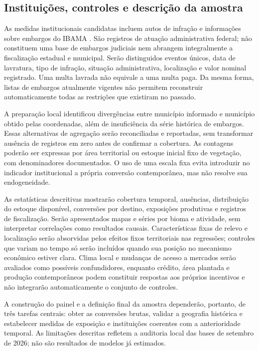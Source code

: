 \subsection{Instituições, controles e descrição da amostra}

As medidas institucionais candidatas incluem autos de infração e informações sobre embargos do IBAMA \cite{IBAMA2026}. São registros de atuação administrativa federal; não constituem uma base de embargos judiciais nem abrangem integralmente a fiscalização estadual e municipal. Serão distinguidos eventos únicos, data de lavratura, tipo de infração, situação administrativa, localização e valor nominal registrado. Uma multa lavrada não equivale a uma multa paga. Da mesma forma, listas de embargos atualmente vigentes não permitem reconstruir automaticamente todas as restrições que existiram no passado.

A preparação local identificou divergências entre município informado e município obtido pelas coordenadas, além de insuficiência da série histórica de embargos. Essas alternativas de agregação serão reconciliadas e reportadas, sem transformar ausência de registros em zero antes de confirmar a cobertura. As contagens poderão ser expressas por área territorial ou estoque inicial fixo de vegetação, com denominadores documentados. O uso de uma escala fixa evita introduzir no indicador institucional a própria conversão contemporânea, mas não resolve sua endogeneidade.

As estatísticas descritivas mostrarão cobertura temporal, ausências, distribuição do estoque disponível, conversões por destino, exposições produtivas e registros de fiscalização. Serão apresentados mapas e séries por bioma e atividade, sem interpretar correlações como resultados causais. Características fixas de relevo e localização serão absorvidas pelos efeitos fixos territoriais nas regressões; controles que variam no tempo só serão incluídos quando sua posição no mecanismo econômico estiver clara. Clima local e mudanças de acesso a mercados serão avaliados como possíveis confundidores, enquanto crédito, área plantada e produção contemporâneos podem constituir respostas aos próprios incentivos e não integrarão automaticamente o conjunto de controles.

A construção do painel e a definição final da amostra dependerão, portanto, de três tarefas centrais: obter as conversões brutas, validar a geografia histórica e estabelecer medidas de exposição e instituições coerentes com a anterioridade temporal. As limitações descritas refletem a auditoria local das bases de setembro de 2026; não são resultados de modelos já estimados.

